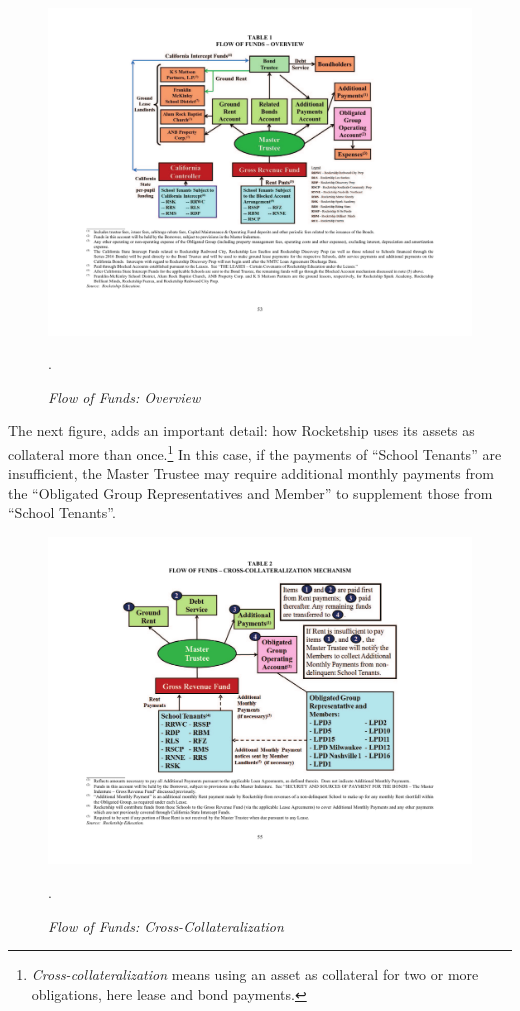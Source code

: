 \begin{figure}[hbt]
  \centering
  \caption[Flow of Funds: Overview]{\textit{Flow of Funds: Overview}}\label{fig:flow_of_funds_overview}
  \includegraphics[width=\textwidth]{Flow_of_Funds_Overview}\\
  \footnotesize\raggedright\textcite[53]{CSFA2017}. 
\end{figure}

The next figure,  adds an important detail: how Rocketship uses its assets as collateral more than once.\footnote{\textit{Cross-collateralization} means using an asset as collateral for two or more obligations, here lease and bond payments.} In this case, if the payments of ``School Tenants'' are insufficient, the Master Trustee may require additional monthly payments from the ``Obligated Group Representatives and Member'' to supplement those from ``School Tenants''. 

\begin{figure}[hbt]
  \centering
  \caption[Flow of Funds: Cross-Collateralization]{\textit{Flow of Funds: Cross-Collateralization}}\label{fig:flow_of_funds_cross-collateralization}
  \includegraphics[width=\textwidth]{Flow_of_Funds_Cross-Collateralization}\\
  \footnotesize\raggedright\textcite[55]{CSFA2017}.
\end{figure}

